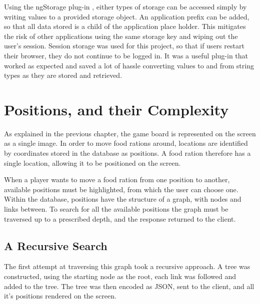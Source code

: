 Using the ngStorage plug-in \cite{reference}, either types of storage can be accessed simply by writing values to a provided storage object. An application prefix can be added, so that all data stored is a child of the application place holder. This mitigates the risk of other applications using the same storage key and wiping out the user's session. Session storage was used for this project, so that if users restart their browser, they do not continue to be logged in. It was a useful plug-in that worked as expected and saved a lot of hassle converting values to and from string types as they are stored and retrieved.

\section{Positions, and their Complexity}
As explained in the previous chapter, the game board is represented on the screen as a single image. In order to move food rations around, locations are identified by coordinates stored in the database as positions. A food ration therefore has a single location, allowing it to be positioned on the screen. 

When a player wants to move a food ration from one position to another, available positions must be highlighted, from which the user can choose one. Within the database, positions have the structure of a graph, with nodes and links between. To search for all the available positions the graph must be traversed up to a prescribed depth, and the response returned to the client.

\subsection{A Recursive Search}
The first attempt at traversing this graph took a recursive approach. A tree was constructed, using the starting node as the root, each link was followed and added to the tree. The tree was then encoded as JSON, sent to the client, and all it's positions rendered on the screen.

